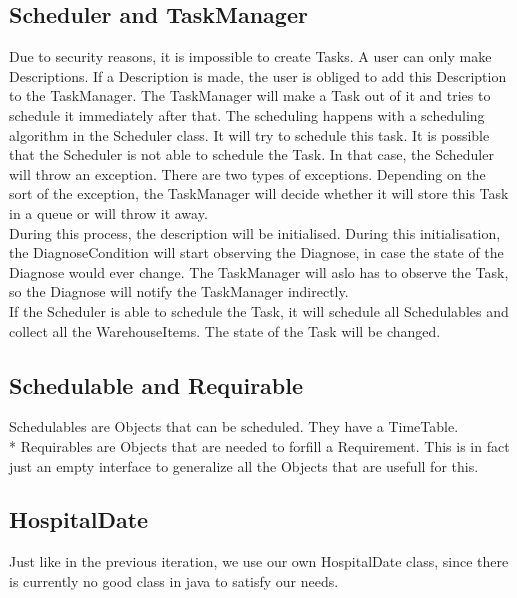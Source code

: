 \documentclass[12pt]{article}
\begin{document}
\subsection{Scheduler and TaskManager}
Due to security reasons, it is impossible to create Tasks. A user can only make Descriptions. If a Description is made, the user is obliged to add this Description to the TaskManager. The TaskManager will make a Task out of it and tries to schedule it immediately after that. The scheduling happens with a scheduling algorithm in the Scheduler class. It will try to schedule this task. It is possible that the Scheduler is not able to schedule the Task. In that case, the Scheduler will throw an exception. There are two types of exceptions. Depending on the sort of the exception, the TaskManager will decide whether it will store this Task in a queue or will throw it away.\\
During this process, the description will be initialised. During this initialisation, the DiagnoseCondition will start observing the Diagnose, in case the state of the Diagnose would ever change. The TaskManager will aslo has to observe the Task, so the Diagnose will notify the TaskManager indirectly.\\
If the Scheduler is able to schedule the Task, it will schedule all Schedulables and collect all the WarehouseItems. The state of the Task will be changed.
\subsection{Schedulable and Requirable}
Schedulables are Objects that can be scheduled. They have a TimeTable.\\*
Requirables are Objects that are needed to forfill a Requirement. This is in fact just an empty interface to generalize all the Objects that are usefull for this.

\subsection{HospitalDate}
Just like in the previous iteration, we use our own HospitalDate class, since there is currently no good class in java to satisfy our needs.
\end{document}

